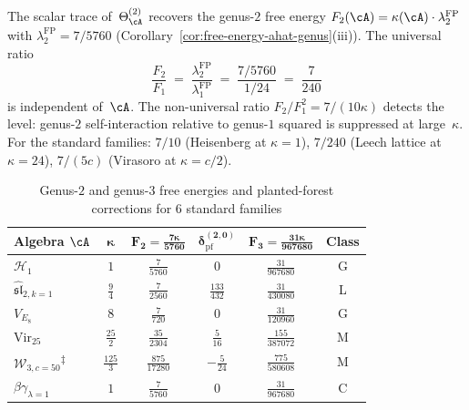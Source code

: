 \begin{remark}
\label{rem:genus2-scalar-numerics}
The scalar trace of~$\Theta^{(2)}_\cA$ recovers the
genus-$2$ free energy
$F_2(\cA) = \kappa(\cA) \cdot \lambda_2^{\mathrm{FP}}$
with $\lambda_2^{\mathrm{FP}} = 7/5760$
(Corollary~\ref{cor:free-energy-ahat-genus}(iii)).
The universal ratio
\[
\frac{F_2}{F_1}
\;=\;
\frac{\lambda_2^{\mathrm{FP}}}{\lambda_1^{\mathrm{FP}}}
\;=\;
\frac{7/5760}{1/24}
\;=\;
\frac{7}{240}
\]
is independent of~$\cA$.  The non-universal ratio
$F_2/F_1^2 = 7/(10\kappa)$ detects the level:
genus-$2$ self-interaction relative to genus-$1$ squared
is suppressed at large~$\kappa$.  For the standard
families: $7/10$ (Heisenberg at $\kappa = 1$),
$7/240$ (Leech lattice at $\kappa = 24$),
$7/(5c)$ (Virasoro at $\kappa = c/2$).

\begin{table}[ht]
\centering
\caption{Genus-$2$ and genus-$3$ free energies and planted-forest corrections
for $6$ standard families}
\label{tab:genus23-landscape}
\renewcommand{\arraystretch}{1.5}
{\small
\begin{tabular}{|l|c|c|c|c|c|}
\hline
\textbf{Algebra $\cA$}
  & $\boldsymbol{\kappa}$
  & $\boldsymbol{F_2 = \frac{7\kappa}{5760}}$
  & $\boldsymbol{\delta_{\mathrm{pf}}^{(2,0)}}$
  & $\boldsymbol{F_3 = \frac{31\kappa}{967680}}$
  & \textbf{Class} \\
\hline
$\mathcal{H}_1$ & $1$ & $\tfrac{7}{5760}$
  & $0$ & $\tfrac{31}{967680}$ & G \\
\hline
$\widehat{\mathfrak{sl}}_{2,k=1}$ & $\tfrac{9}{4}$ & $\tfrac{7}{2560}$
  & $\tfrac{133}{432}$ & $\tfrac{31}{430080}$ & L \\
\hline
$V_{E_8}$ & $8$ & $\tfrac{7}{720}$
  & $0$ & $\tfrac{31}{120960}$ & G \\
\hline
$\mathrm{Vir}_{25}$ & $\tfrac{25}{2}$ & $\tfrac{35}{2304}$
  & $\tfrac{5}{16}$ & $\tfrac{155}{387072}$ & M \\
\hline
$\mathcal{W}_{3,c{=}50}$\textsuperscript{$\ddagger$} & $\tfrac{125}{3}$ & $\tfrac{875}{17280}$
  & $-\tfrac{5}{24}$ & $\tfrac{775}{580608}$ & M \\
\hline
$\beta\gamma_{\lambda=1}$ & $1$ & $\tfrac{7}{5760}$
  & $0$ & $\tfrac{31}{967680}$ & C \\
\hline
\end{tabular}
}%
\end{table}


\end{remark}
